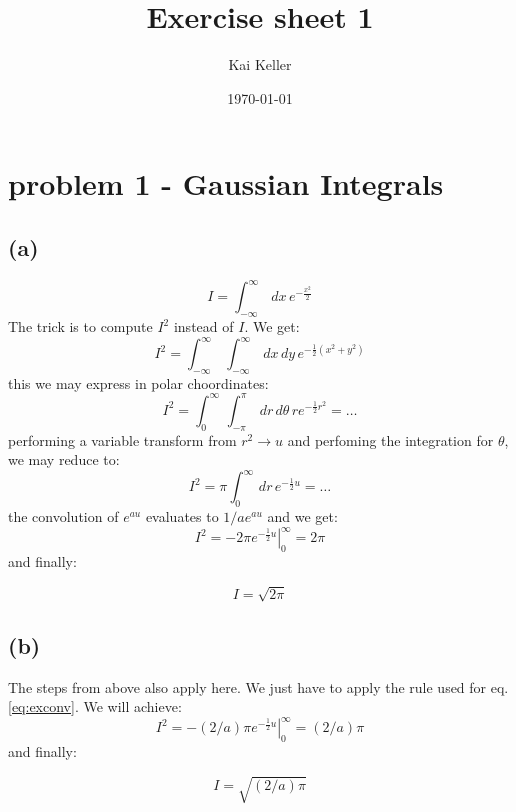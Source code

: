 \documentclass[a4paper]{article}
\title{Exercise sheet 1}
\author{Kai Keller}
\date{\today}
\begin{document}
\maketitle
\tableofcontents

\section{problem 1 - Gaussian Integrals}
\subsection{(a)}
\begin{equation}\label{eq:stdgauss}
I=\int_{-\infty}^{\infty}\,dx\,e^{-\frac{x^2}{2}}
\end{equation} 
The trick is to compute $I^2$ instead of $I$. We get:
\begin{equation}
I^2=\int_{-\infty}^{\infty}\,\int_{-\infty}^{\infty}\,dx\,dy\,e^{-\frac{1}{2}(x^2+y^2)}
\end{equation}
this we may express in polar choordinates:
\begin{equation}
I^2=\int_{0}^{\infty}\,\int_{-\pi}^{\pi}\,dr\,d\theta\,re^{-\frac{1}{2}r^2} = \dots
\end{equation}
performing a variable transform from $r^2 \rightarrow u$ and perfoming the integration for $\theta$, we may reduce to:
\begin{equation}
I^2=\pi\int_{0}^{\infty}\,dr\,e^{-\frac{1}{2}u} = \dots
\end{equation}
the convolution of $e^{au}$ evaluates to $1/ae^{au}$ and we get:
\begin{equation}\label{eq:exconv}
I^2=\left. -2\pi e^{-\frac{1}{2}u}\right|_0^{\infty} = 2\pi
\end{equation}
and finally:
\begin{framed}
\begin{equation}
I=\sqrt{2\pi}
\end{equation}
\end{framed}

\subsection{(b)}
The steps from above also apply here. We just have to apply the rule used for eq. \ref{eq:exconv}. We will achieve:
\begin{equation}
I^2=\left. -(2/a)\pi e^{-\frac{1}{2}u}\right|_0^{\infty} = (2/a)\pi
\end{equation}
and finally:
\begin{framed}
\begin{equation}
I=\sqrt{(2/a)\pi}
\end{equation}
\end{framed}
\end{document}
